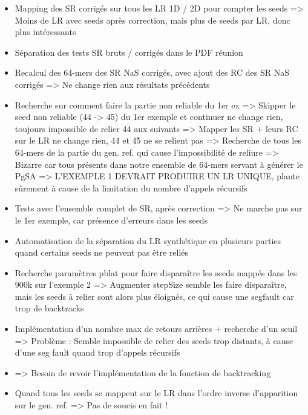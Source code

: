 \documentclass[12pt]{report}
\begin{document}
\begin{itemize}
	\item Mapping des SR corrigés sur tous les LR 1D / 2D pour compter les seeds => Moins de LR avec seeds après correction, mais plus de seeds par LR,
		  donc plus intéressants
	
	\item Séparation des tests SR bruts / corrigés dans le PDF réunion
		  
	\item Recalcul des 64-mers des SR NaS corrigés, avec ajout des RC des SR NaS corrigés => Ne change rien aux résultats précédents
	
	\item Recherche sur comment faire la partie non reliable du 1er ex
		  => Skipper le seed non reliable (44 -> 45) du 1er exemple et continuer ne change rien, toujours impossible de relier 44 aux suivants
		  => Mapper les SR + leurs RC sur le LR ne change rien, 44 et 45 ne se relient pas
		  => Recherche de tous les 64-mers de la partie du gen. ref. qui cause l'impossibilité de reliure => Bizarre car tous présents dans
		  	 notre ensemble de 64-mers servant à générer le PgSA => L'EXEMPLE 1 DEVRAIT PRODUIRE UN LR UNIQUE, plante sûrement à cause
		  	 de la limitation du nombre d'appels récursifs
	
	\item Tests avec l'ensemble complet de SR, après correction => Ne marche pas sur le 1er exemple, car présence d'erreurs dans les seeds
	
	\item Automatisation de la séparation du LR synthétique en plusieurs parties quand certains seeds ne peuvent pas être reliés
	
	\item Recherche paramètres pblat pour faire disparaître les seeds mappés dans les 900k sur l'exemple 2
		  => Augmenter stepSize semble les faire disparaître, mais les seeds à relier sont alors plus éloignés,
		  ce qui cause une segfault car trop de backtracks
	
	\item Implémentation d'un nombre max de retours arrières + recherche d'un seuil => Problème : Semble impossible de relier des seeds
		  trop distants, à cause d'une seg fault quand trop d'appels récursifs
		  
	\item => Besoin de revoir l'implémentation de la fonction de backtracking
	
	\item Quand tous les seeds se mappent sur le LR dans l'ordre inverse d'apparition sur le gen. ref. => Pas de soucis en fait !
\end{itemize}
\end{document}
